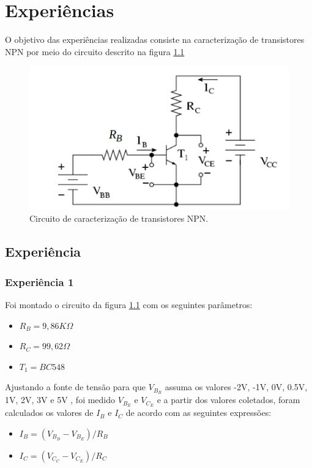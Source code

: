 \documentclass{abntex2}
\begin{document}
\imprimircapa
\imprimirfolhaderosto

\tableofcontents
\listoffigures
\listoftables
\clearpage

\chapter{Experiências}

 O objetivo das experiências realizadas consiste na caracterização de transistores NPN
 por meio do circuito descrito na figura
 \ref{fig:circuito}

\begin{figure}[h]
  \centering
  \includegraphics[scale = 0.5]{circuito.png}
  \caption{Circuito de caracterização de transistores NPN.}
  \label{fig:circuito}
\end{figure}


\section{Experiência}
\subsection{Experiência 1}

Foi montado o circuito da figura \ref{fig:circuito} com os seguintes parâmetros:
\begin{itemize}
  \item $R_B = 9,86K\Omega $
  \item $R_C = 99,62\Omega$
  \item $T_1 = BC548$
\end{itemize}

Ajustando a fonte de tensão para que $V_B_B$ assuma os valores -2V, -1V, 0V, 0.5V, 1V, 2V, 3V e 5V
, foi medido $V_B_E$ e $V_C_E$ e a partir dos valores coletados, foram calculados os valores de $I_B$ e $I_C$ de acordo com as seguintes expressões:
\begin{itemize}
  \item $I_B = (V_B_B - V_B_E) / R_B$
  \item $I_C = (V_C_C - V_C_E) / R_C$
\end{itemize}
\end{document}
